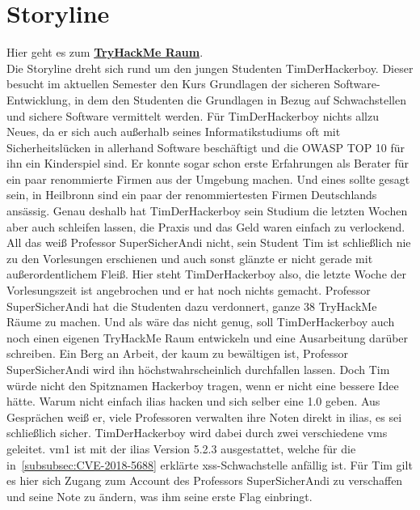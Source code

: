 \documentclass[10pt, a4paper,onecolumn ,titlepage]{article}
\begin{document}
    \section{Storyline}
    \label{sec:storyline}
    Hier geht es zum \href{https://tryhackme.com/room/t1mth3h4ck3rb0y}{\textbf{TryHackMe Raum}}.\vspace{0.5cm}
    \\
    Die Storyline dreht sich rund um den jungen Studenten TimDerHackerboy.
    Dieser besucht im aktuellen Semester den Kurs \glqq Grundlagen der sicheren Software-Entwicklung\grqq, in dem den Studenten die Grundlagen in Bezug auf Schwachstellen und sichere Software vermittelt werden.
    Für TimDerHackerboy nichts allzu Neues, da er sich auch außerhalb seines Informatikstudiums oft mit Sicherheitslücken in allerhand Software beschäftigt und die OWASP TOP 10 für ihn ein Kinderspiel sind.
    Er konnte sogar schon erste Erfahrungen als Berater für ein paar renommierte Firmen aus der Umgebung machen.
    Und eines sollte gesagt sein, in Heilbronn sind ein paar der renommiertesten Firmen Deutschlands ansässig.
    Genau deshalb hat TimDerHackerboy sein Studium die letzten Wochen aber auch schleifen lassen, die Praxis und das Geld waren einfach zu verlockend.
    All das weiß Professor SuperSicherAndi nicht, sein Student Tim ist schließlich nie zu den Vorlesungen erschienen und auch sonst glänzte er nicht gerade mit außerordentlichem Fleiß.
    Hier steht TimDerHackerboy also, die letzte Woche der Vorlesungszeit ist angebrochen und er hat noch nichts gemacht.
    Professor SuperSicherAndi hat die Studenten dazu verdonnert, ganze 38 TryHackMe Räume zu machen.
    Und als wäre das nicht genug, soll TimDerHackerboy auch noch einen eigenen TryHackMe Raum entwickeln und eine Ausarbeitung darüber schreiben.
    Ein Berg an Arbeit, der kaum zu bewältigen ist, Professor SuperSicherAndi wird ihn höchstwahrscheinlich durchfallen lassen.
    Doch Tim würde nicht den Spitznamen Hackerboy tragen, wenn er nicht eine bessere Idee hätte.
    Warum nicht einfach \ac{ilias} hacken und sich selber eine 1.0 geben.
    Aus Gesprächen weiß er, viele Professoren verwalten ihre Noten direkt in \ac{ilias}, es sei schließlich sicher.
    TimDerHackerboy wird dabei durch zwei verschiedene \ac{vm}s geleitet.
    \ac{vm}1 ist mit der \ac{ilias} Version 5.2.3 ausgestattet, welche für die in~\ref{subsubsec:CVE-2018-5688} erklärte \ac{xss}-Schwachstelle anfällig ist.
    Für Tim gilt es hier sich Zugang zum Account des Professors SuperSicherAndi zu verschaffen und seine Note zu ändern, was ihm seine erste Flag einbringt.
\end{document}
